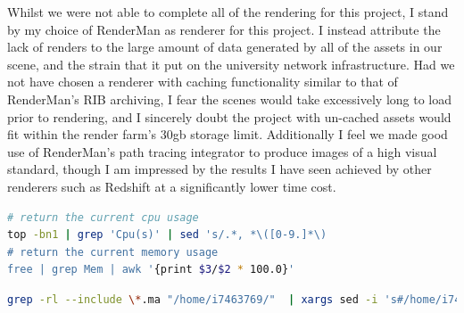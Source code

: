 \documentclass[11pt]{article}
\begin{document}
Whilst we were not able to complete all of the rendering for this project, I stand by my choice of RenderMan as renderer for this project. I instead attribute the lack of renders to the large amount of data generated by all of the assets in our scene, and the strain that it put on the university network infrastructure. Had we not have chosen a renderer with caching functionality similar to that of RenderMan's RIB archiving, I fear the scenes would take excessively long to load prior to rendering, and I sincerely doubt the project with un-cached assets would fit within the render farm's 30gb storage limit. Additionally I feel we made good use of RenderMan's path tracing integrator to produce images of a high visual standard, though I am impressed by the results I have seen achieved by other renderers such as Redshift at a significantly lower time cost.

\newpage




\newpage
\appendix

\begin{lstlisting}[language=bash, label={lst:cpumem}, caption={Extract from the Python script used to determine which of the computers on the university network are suitable for rendering on. By capturing the output of the following commands I was able to get the current CPU and memory usage.}]
# return the current cpu usage
top -bn1 | grep 'Cpu(s)' | sed 's/.*, *\([0-9.]*\)
# return the current memory usage
free | grep Mem | awk '{print $3/$2 * 100.0}'
\end{lstlisting}

\begin{lstlisting}[language=bash, label={lst:grep}, caption={The bash script used to replace any absolute paths in Maya scene files, and replace them with file paths suitable for use on the render farm. (Modified from this StackOverflow thread~\cite{stackoverflow})}]
grep -rl --include \*.ma "/home/i7463769/"  | xargs sed -i 's#/home/i7463769/#/render/i7463769/#g'
\end{lstlisting}
\end{document}
